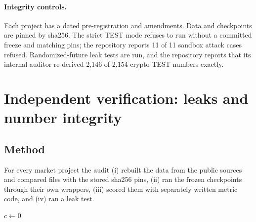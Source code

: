 \documentclass[10pt,a4paper]{article}
\newcommand{\src}[1]{{\footnotesize\texttt{#1}}}
\begin{document}
\paragraph{Integrity controls.} Each project has a dated pre-registration and amendments. Data and checkpoints are pinned by sha256. The strict TEST mode refuses to run without a committed freeze and matching pins; the repository reports 11 of 11 sandbox attack cases refused. Randomized-future leak tests are run, and the repository reports that its internal auditor re-derived 2,146 of 2,154 crypto TEST numbers exactly.

\section{Independent verification: leaks and number integrity}
\label{sec:verify}

\subsection{Method}
For every market project the audit (i) rebuilt the data from the public sources and compared files with the stored sha256 pins, (ii) ran the frozen checkpoints through their own wrappers, (iii) scored them with separately written metric code, and (iv) ran a leak test.

\begin{algorithm}[H]
\caption{Randomized-future leak test (as implemented in \src{audit/*\_check.py})}
\label{alg:leak}
$c \leftarrow 0$\;
 
\end{algorithm}
\end{document}
